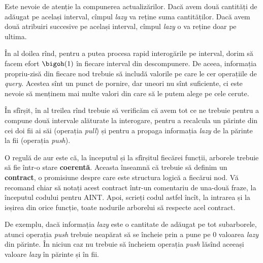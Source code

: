 Este nevoie de atenție la compunerea actualizărilor. Dacă avem două cantități de adăugat pe același interval, cîmpul \textit{lazy} va reține suma cantităților. Dacă avem două atribuiri succesive pe același interval, cîmpul \textit{lazy} o va reține doar pe ultima.

În al doilea rînd, pentru a putea procesa rapid interogările pe interval, dorim să facem efort $\bigoh(1)$ în fiecare interval din descompunere. De aceea, informația propriu-zisă din fiecare nod trebuie să includă valorile pe care le cer operațiile de \textit{query}. Acestea sînt un punct de pornire, dar uneori nu sînt suficiente, ci este nevoie să menținem mai multe valori din care să le putem alege pe cele cerute.

În sfîrșit, în al treilea rînd trebuie să verificăm că avem tot ce ne trebuie pentru a compune două intervale alăturate la interogare, pentru a recalcula un părinte din cei doi fii ai săi (operația \textit{pull}) și pentru a propaga informația \textit{lazy} de la părinte la fii (operația \textit{push}).

O regulă de aur este că, la începutul și la sfîrșitul fiecărei funcții, arborele trebuie să fie într-o stare \textbf{coerentă}. Aceasta înseamnă că trebuie să definim un \textbf{contract}, o promisiune despre care este structura logică a fiecărui nod. Vă recomand chiar să notați acest contract într-un comentariu de una-două fraze, la începutul codului pentru AINT. Apoi, scrieți codul astfel încît, la intrarea și la ieșirea din orice funcție, toate nodurile arborelui să respecte acel contract.

De exemplu, dacă informația \textit{lazy} este o cantitate de adăugat pe tot subarborele, atunci operația \textit{push} trebuie neapărat să se încheie prin a pune pe 0 valoarea \textit{lazy} din părinte. În niciun caz nu trebuie să încheiem operația \textit{push} lăsînd aceeași valoare \textit{lazy} în părinte și în fii.
